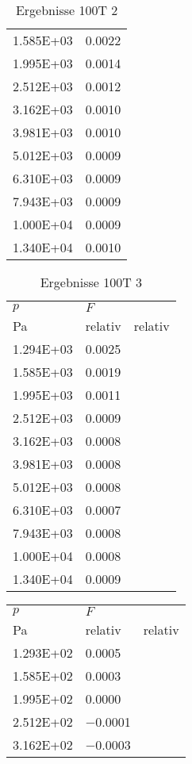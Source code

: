 \begin{table}
\begin{tabular}{l l }
\num{1.585E+03}&\num{0.0022}\\
\num{1.995E+03}&\num{0.0014}\\
\num{2.512E+03}&\num{0.0012}\\
\num{3.162E+03}&\num{0.0010}\\
\num{3.981E+03}&\num{0.0010}\\
\num{5.012E+03}&\num{0.0009}\\
\num{6.310E+03}&\num{0.0009}\\
\num{7.943E+03}&\num{0.0009}\\
\num{1.000E+04}&\num{0.0009}\\
\num{1.340E+04}&\num{0.0010}\\
\bottomrule
\end{tabular}\caption{Ergebnisse 100T 2}\end{table}\begin{table}\begin{tabular}{l l }
\toprule
$p$&$F$\\
 Pa & relativ & relativ\\\midrule
\num{1.294E+03}&\num{0.0025}\\
\num{1.585E+03}&\num{0.0019}\\
\num{1.995E+03}&\num{0.0011}\\
\num{2.512E+03}&\num{0.0009}\\
\num{3.162E+03}&\num{0.0008}\\
\num{3.981E+03}&\num{0.0008}\\
\num{5.012E+03}&\num{0.0008}\\
\num{6.310E+03}&\num{0.0007}\\
\num{7.943E+03}&\num{0.0008}\\
\num{1.000E+04}&\num{0.0008}\\
\num{1.340E+04}&\num{0.0009}\\
\bottomrule
\end{tabular}\caption{Ergebnisse 100T 3}\end{table}\begin{table}\begin{tabular}{l l }
\toprule
$p$&$F$\\
 Pa & relativ & relativ\\\midrule
\num{1.293E+02}&\num{0.0005}\\
\num{1.585E+02}&\num{0.0003}\\
\num{1.995E+02}&\num{0.0000}\\
\num{2.512E+02}&\num{-0.0001}\\
\num{3.162E+02}&\num{-0.0003}\\

\end{tabular}
\end{table}
